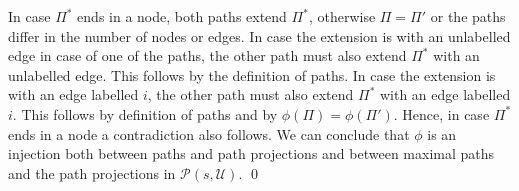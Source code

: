 \documentclass{LMCS}
\theoremstyle{definition}
\newcommand{\apath}{\Pi}
\begin{document}
In case $\apath^*$ ends in a node, both paths extend $\apath^*$,
otherwise $\apath = \apath'$ or the paths differ in the number of nodes
or edges. In case the extension is with an unlabelled edge in case of
one of the paths, the other path must also extend $\apath^*$ with an
unlabelled edge. This follows by the definition of paths. In case
the extension is with an edge labelled $i$, the other path must also
extend $\apath^*$ with an edge labelled $i$. This follows by definition
of paths and by $\phi(\apath) = \phi(\apath')$. Hence, in case
$\apath^*$ ends in a node a contradiction also follows. We can
conclude that $\phi$ is an injection both between paths and path projections
and between maximal paths and the path projections in
$\mathcal{P}(s, \mathcal{U})$.
\qed
\end{document}

